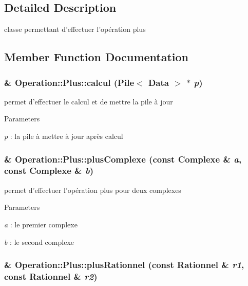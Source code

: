 \subsection{Detailed Description}
classe permettant d'effectuer l'opération plus 

\subsection{Member Function Documentation}
\hypertarget{classOperation_1_1Plus_ad497644da3ea64318f15777d1e3ddcc9}{
\subsubsection[{calcul}]{ \& Operation::Plus::calcul ({\bf Pile}$<$ {\bf Data} $>$ $\ast$ {\em p})}}
\label{classOperation_1_1Plus_ad497644da3ea64318f15777d1e3ddcc9}


permet d'effectuer le calcul et de mettre la pile à jour 


\begin{DoxyParams}{Parameters}
\item[{\em p}]: la pile à mettre à jour après calcul \end{DoxyParams}
\hypertarget{classOperation_1_1Plus_aa80c86b918fd8e37d08ea892d3704596}{
\subsubsection[{plusComplexe}]{ \& Operation::Plus::plusComplexe (const {\bf Complexe} \& {\em a}, \/  const {\bf Complexe} \& {\em b})}}
\label{classOperation_1_1Plus_aa80c86b918fd8e37d08ea892d3704596}


permet d'effectuer l'opération plus pour deux complexes 


\begin{DoxyParams}{Parameters}
\item[{\em a}]: le premier complexe \item[{\em b}]: le second complexe \end{DoxyParams}
\hypertarget{classOperation_1_1Plus_adb1aba33aad17c96c1d9b5624e8df22e}{
\subsubsection[{plusRationnel}]{ \& Operation::Plus::plusRationnel (const {\bf Rationnel} \& {\em r1}, \/  const {\bf Rationnel} \& {\em r2})}}
\label{classOperation_1_1Plus_adb1aba33aad17c96c1d9b5624e8df22e}


